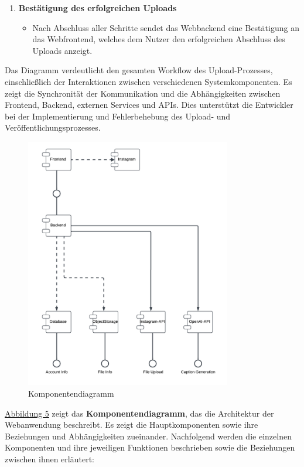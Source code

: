 \begin{enumerate}
    \item \textbf{Bestätigung des erfolgreichen Uploads}
    \begin{itemize}
        \item Nach Abschluss aller Schritte sendet das Webbackend eine Bestätigung an das Webfrontend, welches dem Nutzer den erfolgreichen Abschluss des Uploads anzeigt.
    \end{itemize}
\end{enumerate}

Das Diagramm verdeutlicht den gesamten Workflow des Upload-Prozesses, einschließlich der Interaktionen zwischen verschiedenen Systemkomponenten. Es zeigt die Synchronität der Kommunikation 
und die Abhängigkeiten zwischen Frontend, Backend, externen Services und \acp{API}. Dies unterstützt die Entwickler bei der Implementierung und Fehlerbehebung des Upload- und Veröffentlichungsprozesses.


\begin{figure}[htb]
    \centering
    \includegraphics[width=0.8\textwidth]{graphics/components_diagram.png}
    \caption{Komponentendiagramm}
    \label{fig:fig-5}
\end{figure}

\hyperref[fig:fig-5]{Abbildung 5} zeigt das \textbf{Komponentendiagramm}, das die Architektur der Webanwendung beschreibt. Es zeigt die Hauptkomponenten sowie ihre Beziehungen und 
Abhängigkeiten zueinander. Nachfolgend werden die einzelnen Komponenten und ihre jeweiligen Funktionen beschrieben sowie die Beziehungen zwischen ihnen erläutert:
\clearpage

